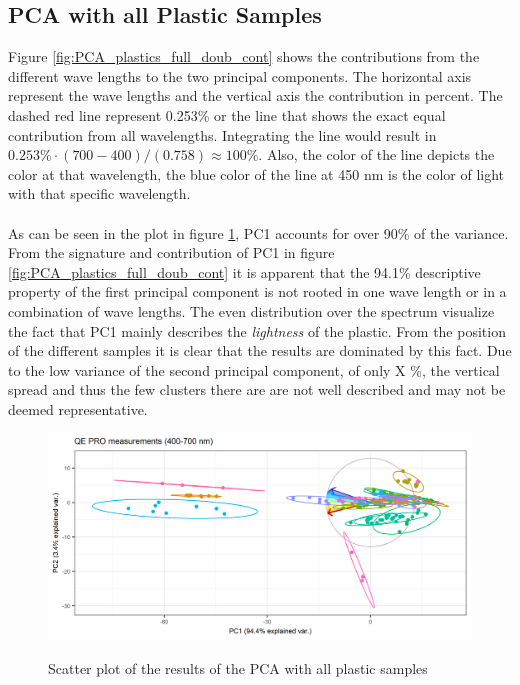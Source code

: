 \subsection{PCA with all Plastic Samples}
Figure \ref{fig:PCA_plastics_full_doub_cont} shows the contributions from the different wave lengths to the two principal components. The horizontal axis represent the wave lengths and the vertical axis the contribution in percent. The dashed red line represent 0.253\% or the line that shows the exact equal contribution from all wavelengths. Integrating the line would result in $0.253\% \cdot (700 - 400)/(0.758) \approx 100\%$.%
Also, the color of the line depicts the color at that wavelength, the blue color of the line at 450 nm is the color of light with that specific wavelength. 
\\\\%
As can be seen in the plot in figure \ref{fig:PCA_plastics_only_full_scat}, PC1 accounts for over 90\% of the variance. From the signature and contribution of PC1 in figure \ref{fig:PCA_plastics_full_doub_cont} it is apparent that the 94.1\% descriptive property of the first principal component is not rooted in one wave length or in a combination of wave lengths. The even distribution over the spectrum visualize the fact that PC1 mainly describes the \textit{lightness} of the plastic. From the position of the different samples it is clear that the results are dominated by this fact. Due to the low variance of the second principal component, of only X \%, the vertical spread and thus the few clusters there are are not well described and may not be deemed representative.

\begin{figure}[H]
    \centering
    \includegraphics[width=1\textwidth]{Images/results/PCA_plastics_full_only_scat.png}
    \label{fig:PCA_plastics_only_full_scat}
    \caption{Scatter plot of the results of the PCA with all plastic samples}
\end{figure}


